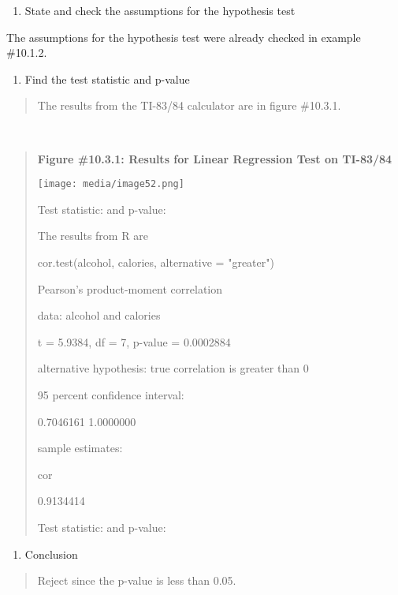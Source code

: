 \documentclass[]{book}
\providecommand{\tightlist}{%
  \setlength{\itemsep}{0pt}\setlength{\parskip}{0pt}}
\begin{document}
\begin{enumerate}
\def\labelenumi{\arabic{enumi}.}
\setcounter{enumi}{2}
\tightlist
\item
  State and check the assumptions for the hypothesis test
\end{enumerate}

The assumptions for the hypothesis test were already checked in example \#10.1.2.

\begin{enumerate}
\def\labelenumi{\arabic{enumi}.}
\setcounter{enumi}{3}
\tightlist
\item
  Find the test statistic and p-value
\end{enumerate}

\begin{quote}
The results from the TI-83/84 calculator are in figure \#10.3.1.
\end{quote}

\textbf{\\
}

\begin{quote}
\textbf{Figure \#10.3.1: Results for Linear Regression Test on TI-83/84}

\texttt{[image: media/image52.png]}

Test statistic: and p-value:

The results from R are

cor.test(alcohol, calories, alternative = "greater")

Pearson's product-moment correlation

data: alcohol and calories

t = 5.9384, df = 7, p-value = 0.0002884

alternative hypothesis: true correlation is greater than 0

95 percent confidence interval:

0.7046161 1.0000000

sample estimates:

cor

0.9134414

Test statistic: and p-value:
\end{quote}

\begin{enumerate}
\def\labelenumi{\arabic{enumi}.}
\setcounter{enumi}{4}
\tightlist
\item
  Conclusion
\end{enumerate}

\begin{quote}
Reject since the p-value is less than 0.05.
\end{quote}
\end{document}

